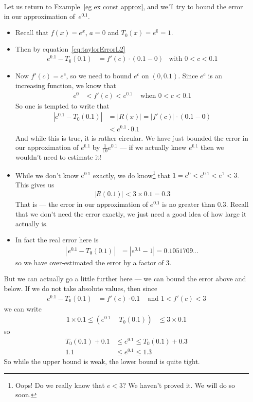\begin{eg}\label{eg zero approx of e}
  Let us return to Example~\ref{eg ex const approx}, and we'll try to bound the error in
our approximation of~$e^{0.1}$.

\begin{itemize}
 \item Recall that $f(x) = e^x$, $a=0$ and $T_0(x) = e^0 = 1$.
 \item Then by equation~\eqref{eq:taylorErrorL2}
  \begin{align*}
    e^{0.1} - T_0(0.1) &= f'(c) \cdot (0.1 - 0) & \text{with $0<c<0.1$}
  \end{align*}
  \item Now $f'(c) = e^c$, so we need to bound $e^c$ on $(0,0.1)$. Since $e^c$ is an
  increasing function, we know that
  \begin{align*}
    e^0 &< f'(c) < e^{0.1}  & \text{ when $0<c<0.1$}
  \end{align*}
  So one is tempted to write that
  \begin{align*}
    |e^{0.1} - T_0(0.1)| &= |R(x)| = |f'(c)| \cdot (0.1 - 0)\\
    & < e^{0.1} \cdot 0.1
  \end{align*}
  And while this is true, it is rather circular. We have just bounded the error in our
  approximation of $e^{0.1}$ by $\frac{1}{10}e^{0.1}$ --- if we actually knew $e^{0.1}$
  then we wouldn't need to estimate it!

  \item While we don't know $e^{0.1}$ exactly, we do know\footnote{Oops! Do we
really know that $e<3$? We haven't proved it. We will do so soon.}
that $1 = e^0 < e^{0.1} < e^1 <
3$. This   gives us
  \begin{align*}
    |R(0.1)| < 3 \times 0.1 = 0.3
  \end{align*}
  That is --- the error in our approximation of $e^{0.1}$ is no greater than $0.3$.
  Recall that we don't need the error exactly, we just need a good idea of how large it
  actually is.

  \item In fact the real error here is
\begin{align*}
  |e^{0.1} - T_0(0.1)| &=|e^{0.1} - 1| = 0.1051709\dots
\end{align*}
so we have over-estimated the error by a factor of 3.
\end{itemize}

But we can actually go a little further here --- we can bound the error above and below.
If we do not take absolute values, then since
  \begin{align*}
    e^{0.1} - T_0(0.1) &= f'(c) \cdot 0.1 & \text{ and } 1 < f'(c) < 3
  \end{align*}
we can write
\begin{align*}
  1\times 0.1 \leq ( e^{0.1} - T_0(0.1) ) & \leq 3\times 0.1
\end{align*}
so
\begin{align*}
  T_0(0.1) + 0.1 &\leq e^{0.1} \leq T_0(0.1)+0.3 \\
  1.1 &\leq e^{0.1} \leq 1.3
\end{align*}
So while the upper bound is weak, the lower bound is quite tight.


\end{eg}
